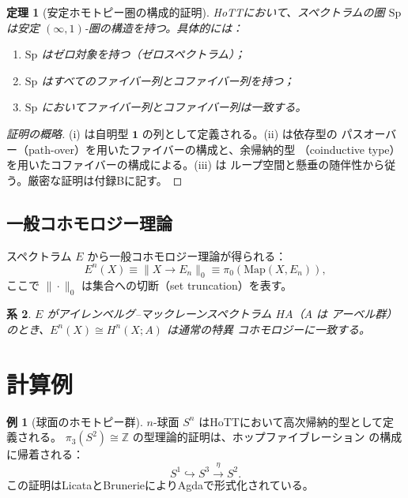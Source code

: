 \documentclass[12pt,a4paper]{article}
\newtheorem{theorem}{定理}[section]
\newtheorem{corollary}[theorem]{系}
\theoremstyle{definition}
\newtheorem{example}{例}[section]
\begin{document}
\begin{theorem}[安定ホモトピー圏の構成的証明]\label{thm:stable}
HoTTにおいて、スペクトラムの圏 $\mathrm{Sp}$ は安定
$(\infty,1)$-圏の構造を持つ。具体的には：
\begin{enumerate}[label=(\roman*)]
  \item $\mathrm{Sp}$ はゼロ対象を持つ（ゼロスペクトラム）；
  \item $\mathrm{Sp}$ はすべてのファイバー列とコファイバー列を持つ；
  \item $\mathrm{Sp}$ においてファイバー列とコファイバー列は一致する。
\end{enumerate}
\end{theorem}

\begin{proof}[証明の概略]
(i) は自明型 $\mathbf{1}$ の列として定義される。(ii) は依存型の
パスオーバー（path-over）を用いたファイバーの構成と、余帰納的型
（coinductive type）を用いたコファイバーの構成による。(iii) は
ループ空間と懸垂の随伴性から従う。厳密な証明は付録Bに記す。
\end{proof}

\subsection{一般コホモロジー理論}

スペクトラム $E$ から一般コホモロジー理論が得られる：
\begin{equation}\label{eq:cohomology}
  E^n(X) \equiv \|X \to E_n\|_0 \equiv \pi_0(\mathrm{Map}(X, E_n)),
\end{equation}
ここで $\|\cdot\|_0$ は集合への切断（set truncation）を表す。

\begin{corollary}
$E$ がアイレンベルグ--マックレーンスペクトラム $HA$（$A$ は
アーベル群）のとき、$E^n(X) \cong H^n(X; A)$ は通常の特異
コホモロジーに一致する。
\end{corollary}


\section{計算例}

\begin{example}[球面のホモトピー群]
$n$-球面 $S^n$ はHoTTにおいて高次帰納的型として定義される。
$\pi_3(S^2) \cong \mathbb{Z}$ の型理論的証明は、ホップファイブレーション
の構成に帰着される：
\begin{equation}
  S^1 \hookrightarrow S^3 \xrightarrow{\eta} S^2.
\end{equation}
この証明はLicataとBrunerie\cite{licata2013pi3s2}によりAgdaで形式化されている。
\end{example}
\end{document}
